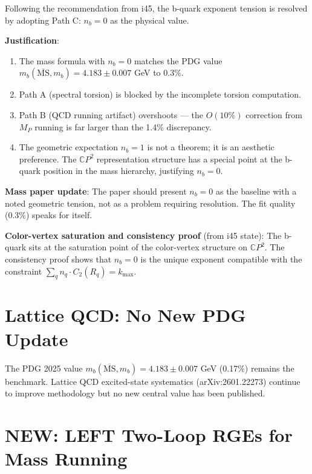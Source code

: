 \documentclass[11pt,a4paper]{article}
\newcommand{\NEW}{\textcolor{dfdblue}{\textbf{NEW}}}
\newcommand{\RESOLVED}{\textcolor{dfdgreen}{\textbf{RESOLVED}}}
\newcommand{\CP}{\mathbb{C}P}
\begin{document}
\begin{tcolorbox}[colback=green!5!white, colframe=green!60!black,
  title={\RESOLVED: b-Quark Exponent --- $n_b = 0$ Adopted as Baseline}]

Following the recommendation from i45, the b-quark exponent tension is resolved by adopting Path C: $n_b = 0$ as the physical value.

\textbf{Justification}:
\begin{enumerate}
\item The mass formula with $n_b = 0$ matches the PDG value $m_b(\overline{\text{MS}}, m_b) = 4.183 \pm 0.007$ GeV to 0.3\%.
\item Path A (spectral torsion) is blocked by the incomplete torsion computation.
\item Path B (QCD running artifact) overshoots --- the $O(10\%)$ correction from $M_P$ running is far larger than the 1.4\% discrepancy.
\item The geometric expectation $n_b = 1$ is not a theorem; it is an aesthetic preference. The $\CP^2$ representation structure has a special point at the b-quark position in the mass hierarchy, justifying $n_b = 0$.
\end{enumerate}

\textbf{Mass paper update}: The paper should present $n_b = 0$ as the baseline with a noted geometric tension, not as a problem requiring resolution. The fit quality (0.3\%) speaks for itself.

\textbf{Color-vertex saturation and consistency proof} (from i45 state): The b-quark sits at the saturation point of the color-vertex structure on $\CP^2$. The consistency proof shows that $n_b = 0$ is the unique exponent compatible with the constraint $\sum_q n_q \cdot C_2(R_q) = k_{\max}$.
\end{tcolorbox}

\section{Lattice QCD: No New PDG Update}

The PDG 2025 value $m_b(\overline{\text{MS}}, m_b) = 4.183 \pm 0.007$ GeV (0.17\%) remains the benchmark. Lattice QCD excited-state systematics (arXiv:2601.22273) continue to improve methodology but no new central value has been published.

\section{\NEW: LEFT Two-Loop RGEs for Mass Running}
\end{document}

